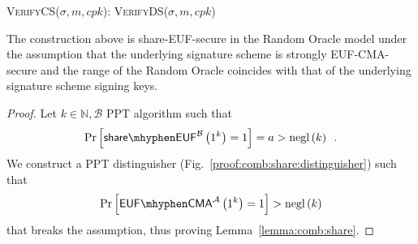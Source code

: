     \begin{algorithmic}[0]
      \State \textsc{VerifyCS}($\sigma, m, cpk$):
      \Indent
        \State \Return \textsc{VerifyDS}($\sigma, m, cpk$)
      \EndIndent
    \end{algorithmic}

    \begin{lemma}
      \label{lemma:comb:share}
      The construction above is \textsf{share-EUF}-secure in the Random Oracle
      model under the assumption that the underlying signature scheme is
      strongly \textsf{EUF-CMA}-secure and the range of the Random Oracle
      coincides with that of the underlying signature scheme signing keys.
    \end{lemma}

    \begin{proof}
      Let $k \in \mathbb{N}, \mathcal{B}$ PPT algorithm such that
      \begin{equation*}
        \Pr\left[\mathsf{share \mhyphen EUF}^{\mathcal{B}}\left(1^k\right) =
        1\right] = a > \mathrm{negl}\left(k\right) \enspace.
      \end{equation*}
      We construct a PPT distinguisher \adversary{}
      (Fig.~\ref{proof:comb:share:distinguisher}) such that
      \begin{equation*}
        \Pr\left[\mathsf{EUF \mhyphen CMA}^{\adversary}\left(1^k\right) =
        1\right] > \mathrm{negl}\left(k\right)
      \end{equation*}
      that breaks the assumption, thus proving Lemma~\ref{lemma:comb:share}.


\end{proof}

